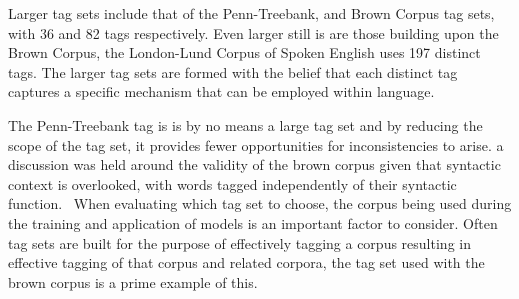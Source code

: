 \documentclass[10pt]{report}
\begin{document}
Larger tag sets include that of the Penn-Treebank, and Brown Corpus tag sets, with 36 and 82 tags respectively. Even larger still is are those building upon the Brown Corpus, the London-Lund Corpus
of Spoken English uses 197 distinct tags. The larger tag sets are formed with the belief that each distinct tag captures a specific mechanism that can be employed within language. ~\cite{garside1988computational}

The Penn-Treebank tag is is by no means a large tag set and by reducing the scope of the tag set, it provides fewer opportunities for inconsistencies to arise. a discussion was held around the validity of the brown corpus given that syntactic context is overlooked, with words tagged independently of their syntactic function.~\cite{Marcus1993-tw} When evaluating which tag set to choose, the corpus being used during the training and application of models is an important factor to consider. Often tag sets are built for the purpose of effectively tagging a corpus resulting in effective tagging of that corpus and related corpora, the tag set used with the brown corpus is a prime example of this.
\end{document}

